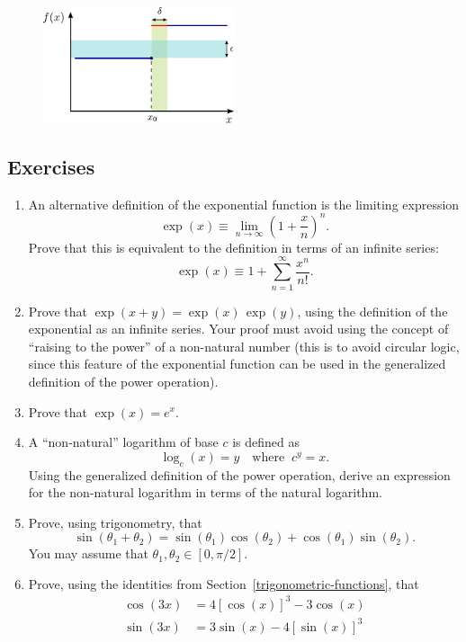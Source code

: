 \documentclass[10pt,a4paper]{article}
\begin{document}
\begin{figure}[h]
  \centering\includegraphics[width=0.5\textwidth]{discontinuity}
\end{figure}

\subsection{Exercises}
\label{exercises}

\begin{enumerate}
\item 
An alternative definition of the exponential function is the limiting
expression
\begin{equation}
  \exp(x) \equiv \lim_{n\rightarrow\infty} \left(1+\frac{x}{n}\right)^n.
\end{equation}
Prove that this is equivalent to the definition in terms of an infinite
series:
\begin{equation}
  \exp(x) \equiv 1 + \sum_{n=1}^\infty\frac{x^n}{n!}.
\end{equation}

\item
Prove that $\exp(x+y) = \exp(x)\,\exp(y)$, using the definition of the
exponential as an infinite series. Your proof must avoid using the
concept of ``raising to the power'' of a non-natural number (this is to
avoid circular logic, since this feature of the exponential function can
be used in the generalized definition of the power operation).

\item
Prove that $\exp(x) = e^x.$

\item
  A ``non-natural'' logarithm of base $c$ is defined as
  \begin{equation}
    \log_c(x) = y \quad\mathrm{where}\;\; c^y = x.
  \end{equation}
  Using the generalized definition of the power operation, derive an
  expression for the non-natural logarithm in terms of the natural
  logarithm.

\item
Prove, using trigonometry,
that
\begin{equation}
  \sin(\theta_1 + \theta_2) = \sin(\theta_1) \cos(\theta_2) + \cos(\theta_1)\sin(\theta_2).
\end{equation}
You may assume that $\theta_1, \theta_2 \in [0, \pi/2].$

\item
Prove, using the identities from Section~\ref{trigonometric-functions},
that
\begin{align}
  \cos(3x) &= 4[\cos(x)]^3 -3\cos(x) \\
  \sin(3x) &= 3\sin(x)-4[\sin(x)]^3
\end{align}
\end{enumerate}
\end{document}
